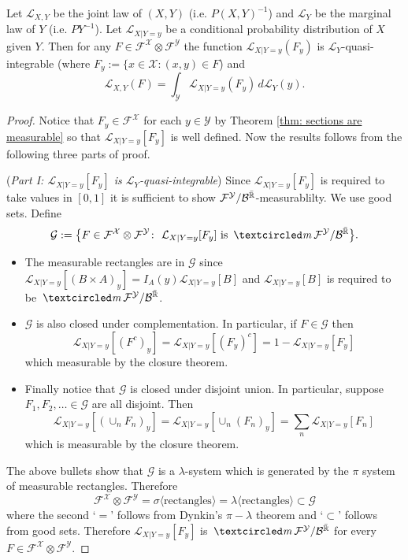 \begin{theorem}
\label{thm: factor the joint}
Let $\mathcal L_{X,Y}$ be the joint law of $(X,Y)$ (i.e. $P(X,Y)^{-1}$) and $\mathcal L_Y$ be the  marginal law of $Y$ (i.e. $PY^{-1}$). Let $\mathcal L_{X|Y=y}$ be a conditional probability distribution of $X$ given $Y$. Then for any $F\in \mathcal F^{\mathcal X}\otimes \mathcal F^{\mathcal Y}$ the function $\mathcal L_{X|Y=y}(F_y)$ is $\mathcal L_Y$-quasi-integrable (where $F_y:=\{x\in\mathcal X\colon (x,y)\in F$) and
\begin{equation}
\label{eq: factor the joint}
\mathcal L_{X,Y}(F) = \int_{\mathcal Y} \mathcal L_{X|Y=y}(F_y) \,d\mathcal L_Y(y).
\end{equation}
\end{theorem}
\begin{proof}
Notice that $F_y\in\mathcal F^{\mathcal X}$ for each $y\in\mathcal Y$ by Theorem \ref{thm: sections are measurable} so that $\mathcal L_{X|Y=y}[F_y]$ is well defined. Now the results follows from the following three parts of proof.

({\sl Part  I: $\mathcal L_{X|Y=y}[F_y]$ is $\mathcal L_Y$-quasi-integrable}) Since $\mathcal L_{X|Y=y}[F_y]$ is required to take values in $[0,1]$ it is sufficient to show $\mathcal F^{\mathcal Y}/\mathcal B^{\bar{\Bbb R}}$-measurablilty.  We use good sets. Define
\begin{equation}
\mathcal G:=\bigl\{F\in  \mathcal F^{\mathcal X}\otimes \mathcal F^{\mathcal Y}\colon \text{ $\mathcal L_{X|Y=y}[F_y]$ is $\mcirc\mathcal F^{\mathcal Y}/\mathcal B^{\bar{\Bbb R}}$} \bigr\}.
\end{equation}
\begin{itemize}
\item
 The measurable rectangles are in $\mathcal G$ since $\mathcal L_{X|Y=y}[(B\times A)_y]= I_{A}(y)\mathcal L_{X|Y=y}[B]$ and $\mathcal L_{X|Y=y}[B]$ is required to be $\mcirc\mathcal F^{\mathcal Y}/\mathcal B^{\bar{\Bbb R}}$.
 \item  $\mathcal G$ is also closed under complementation. In particular, if $F\in\mathcal G$ then
\[ \mathcal L_{X|Y=y}[(F^c)_y] = \mathcal L_{X|Y=y}[(F_y)^c] = 1- \mathcal L_{X|Y=y}[F_y]  \]
which measurable by the closure theorem.
\item
Finally notice that  $\mathcal G$ is closed under disjoint union. In particular, suppose $F_1, F_2, \ldots\in\mathcal G$ are all disjoint. Then
\[  \mathcal L_{X|Y=y}[(\cup_n F_n)_y] = \mathcal L_{X|Y=y}[\cup_n (F_n)_y] = \textstyle\sum_n\mathcal L_{X|Y=y}[F_n] \] which is measurable by the closure theorem.
\end{itemize}
The above bullets show that $\mathcal G$ is a $\lambda$-system which is generated by the $\pi$ system of measurable rectangles. Therefore
\[
\mathcal F^{\mathcal X}\otimes \mathcal F^{\mathcal Y} = \sigma\langle \text{rectangles} \rangle = \lambda\langle\text{rectangles} \rangle\subset\mathcal G
\]
where the second `$=$' follows from Dynkin's $\pi-\lambda$ theorem and `$\subset$' follows from good sets. Therefore
$\mathcal L_{X|Y=y}[F_y]$ is $\mcirc\mathcal F^{\mathcal Y}/\mathcal B^{\bar{\Bbb R}}$ for every $F\in \mathcal F^{\mathcal X}\otimes \mathcal F^{\mathcal Y} $.




\end{proof}
